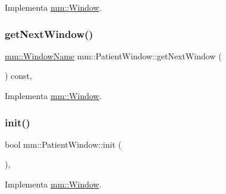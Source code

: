 Implementa \hyperlink{classmm_1_1_window_a942c9125bf42156a9f7b7f561e412fed}{mm\+::\+Window}.

\mbox{\label{classmm_1_1_patient_window_ae22b9bce4c7ccdbcc45feb080088a558}} 
\subsubsection{\texorpdfstring{get\+Next\+Window()}{getNextWindow()}}
{\footnotesize\ttfamily \hyperlink{namespacemm_a4e9d92e04f65dbf2fc1963947da0d93c}{mm\+::\+Window\+Name} mm\+::\+Patient\+Window\+::get\+Next\+Window (\begin{DoxyParamCaption}{ }\end{DoxyParamCaption}) const\hspace{0.3cm}{\ttfamily [override]}, {\ttfamily [virtual]}}



Implementa \hyperlink{classmm_1_1_window_a0cd7b4b0feb9505c44503547a161fcd8}{mm\+::\+Window}.

\mbox{\label{classmm_1_1_patient_window_a0ad27245769b095559858eeecdbb7089}} 
\subsubsection{\texorpdfstring{init()}{init()}}
{\footnotesize\ttfamily bool mm\+::\+Patient\+Window\+::init (\begin{DoxyParamCaption}{ }\end{DoxyParamCaption})\hspace{0.3cm}{\ttfamily [override]}, {\ttfamily [virtual]}}



Implementa \hyperlink{classmm_1_1_window_aba03fbf4761b2f106352baecf5996e10}{mm\+::\+Window}.

\mbox{\label{classmm_1_1_patient_window_a461de186f72a8902a9f95a622dc1c02b}} 
